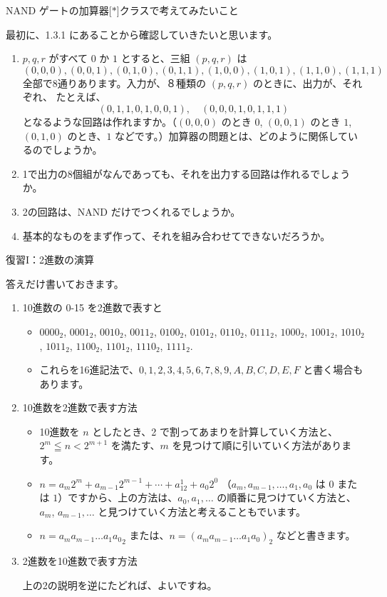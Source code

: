 \documentclass[10pt, dvipdfmx]{beamer}
\begin{document}
\begin{frame}{NAND ゲートの加算器\hfill[$\ast$]}{クラスで考えてみたいこと}

最初に、1.3.1 にあることから確認していきたいと思います。


\begin{enumerate}
\item  $p, q, r$ がすべて $0$ か $1$ とすると、三組 $(p,q,r)$ は
\[
(0,0,0), (0,0,1), (0,1,0), (0,1,1), (1,0,0), (1,0,1), (1,1,0), (1,1,1)
\]
全部で8通りあります。入力が、８種類の $(p,q,r)$  のときに、出力が、それぞれ、 たとえば、
\[
(0, 1, 1, 0, 1, 0, 0, 1), \quad (0,0,0,1,0,1,1,1)
\]
となるような回路は作れますか。（$(0,0,0)$ のとき $0$, $(0,0,1)$ のとき $1$,
$(0,1,0)$ のとき、$1$ などです。）加算器の問題とは、どのように関係しているのでしょうか。
\item  1で出力の8個組がなんであっても、それを出力する回路は作れるでしょうか。
\item 2の回路は、NAND だけでつくれるでしょうか。
\item  基本的なものをまず作って、それを組み合わせてできないだろうか。
\end{enumerate}
\end{frame}
\begin{frame}{復習I：2進数の演算}

答えだけ書いておきます。
\begin{enumerate}
\item 10進数の 0-15 を2進数で表すと
\begin{itemize}
    \item \(0000_2\), \(0001_2\), \(0010_2\), \(0011_2\), \(0100_2\), \(0101_2\), \(0110_2\), \(0111_2\), \(1000_2\), \(1001_2\), \(1010_2\), \(1011_2\), \(1100_2\), \(1101_2\), \(1110_2\), \(1111_2\). 
    \item これらを16進記法で、\(0, 1, 2, 3, 4, 5, 6, 7, 8, 9, A, B, C, D, E, F\) と書く場合もあります。
\end{itemize}

\item 10進数を2進数で表す方法
\begin{itemize}
    \item 10進数を \(n\) としたとき、2 で割ってあまりを計算していく方法と、\(2^m \leqq n < 2^{m+1}\) を満たす、\(m\) を見つけて順に引いていく方法があります。
    \item \(n = a_m2^m + a_{m-1}2^{m-1} + \cdots + a_12^1 + a_0 2^0\) （\(a_m, a_{m-1}, \ldots, a_1, a_0\) は \(0\) または \(1\)）ですから、上の方法は、\(a_0, a_1, \ldots\) の順番に見つけていく方法と、\(a_m\), \(a_{m-1}, \ldots\) と見つけていく方法と考えることもでいます。
    \item \(n = {a_ma_{m-1}\ldots a_1a_0}_2\) または、\(n = {(a_ma_{m-1}\ldots a_1a_0)}_2\) などと書きます。
\end{itemize}
\item 2進数を10進数で表す方法\par
上の2の説明を逆にたどれば、よいですね。
\end{enumerate}
\end{frame}
\end{document}
